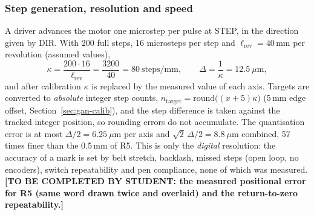 \subsubsection{Step generation, resolution and speed}
\label{sec:gan-res}

A driver advances the motor one microstep per pulse at STEP, in the direction given by DIR.
With 200 full steps, 16 microsteps per step and $\ell_{\mathrm{rev}}=40$\,mm per revolution (assumed values),
\begin{equation}
\kappa=\frac{200\cdot16}{\ell_{\mathrm{rev}}}=\frac{3200}{40}=80\ \mathrm{steps/mm},\qquad\Delta=\frac1\kappa=12.5\ \mu\mathrm{m},
\label{eq:gan-spm}
\end{equation}
and after calibration $\kappa$ is replaced by the measured value of each axis.
Targets are converted to \emph{absolute} integer step counts, $n_{\mathrm{target}}=\mathrm{round}\bigl((x+5)\kappa\bigr)$ (5\,mm edge offset, Section~\ref{sec:gan-calib}), and the step difference is taken against the tracked integer position, so rounding errors do not accumulate.
The quantisation error is at most $\Delta/2=6.25\ \mu$m per axis and $\sqrt2\,\Delta/2=8.8\ \mu$m combined, 57 times finer than the 0.5\,mm of R5.
This is only the \emph{digital} resolution: the accuracy of a mark is set by belt stretch, backlash, missed steps (open loop, no encoders), switch repeatability and pen compliance, none of which was measured.
\textbf{[TO BE COMPLETED BY STUDENT: the measured positional error for R5 (same word drawn twice and overlaid) and the return-to-zero repeatability.]}

